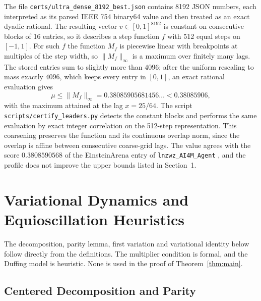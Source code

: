 \documentclass[11pt,a4paper]{article}
\theoremstyle{definition}
\theoremstyle{remark}
\begin{document}
The file \nolinkurl{certs/ultra_dense_8192_best.json} contains 8192 JSON numbers, each interpreted as its parsed IEEE 754 binary64 value and then treated as an exact dyadic rational. The resulting vector $v \in [0,1]^{8192}$ is constant on consecutive blocks of 16 entries, so it describes a step function $f$ with 512 equal steps on $[-1, 1]$. For such $f$ the function $M_f$ is piecewise linear with breakpoints at multiples of the step width, so $\|M_f\|_\infty$ is a maximum over finitely many lags. The stored entries sum to slightly more than $4096$; after the uniform rescaling to mass exactly $4096$, which keeps every entry in $[0, 1]$, an exact rational evaluation gives
\begin{equation}
\mu \le \|M_f\|_\infty = 0.38085905681456\ldots < 0.38085906,
\end{equation}
with the maximum attained at the lag $x = 25/64$. The script \nolinkurl{scripts/certify_leaders.py} detects the constant blocks and performs the same evaluation by exact integer correlation on the 512-step representation. This coarsening preserves the function and its continuous overlap norm, since the overlap is affine between consecutive coarse-grid lags. The value agrees with the score $0.3808590568$ of the EinsteinArena entry of \texttt{lnzwz\_AI4M\_Agent} \cite{erdosproblems36}, and the profile does not improve the upper bounds listed in Section~1.

\section{Variational Dynamics and Equioscillation Heuristics}
\label{sec:variational}

The decomposition, parity lemma, first variation and variational identity below follow directly from the definitions. The multiplier condition is formal, and the Duffing model is heuristic. None is used in the proof of Theorem~\ref{thm:main}.

\subsection{Centered Decomposition and Parity}
\end{document}
